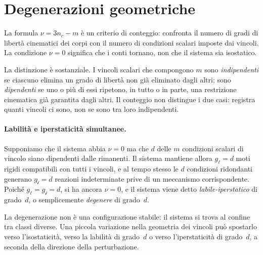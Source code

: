 \section{Degenerazioni geometriche}
\label{sec:degenerazioni}

La formula $\nu = 3n_c - m$ è un criterio di conteggio: confronta il numero di
gradi di libertà cinematici dei corpi con il numero di condizioni scalari
imposte dai vincoli.
La condizione $\nu = 0$ significa che i conti tornano, non che il sistema
sia isostatico.

La distinzione è sostanziale.
I vincoli scalari che compongono $m$ sono \emph{indipendenti} se ciascuno
elimina un grado di libertà non già eliminato dagli altri; sono
\emph{dipendenti} se uno o più di essi ripetono, in tutto o in parte,
una restrizione cinematica già garantita dagli altri.
Il conteggio non distingue i due casi: registra quanti vincoli ci sono,
non se sono tra loro indipendenti.

\paragraph{Labilità e iperstaticità simultanee.}
Supponiamo che il sistema abbia $\nu = 0$ ma che $d$ delle $m$ condizioni
scalari di vincolo siano dipendenti dalle rimanenti.
Il sistema mantiene allora $g_\ell = d$ moti rigidi compatibili con tutti
i vincoli, e al tempo stesso le $d$ condizioni ridondanti generano
$g_{\mathscr{i}} = d$ reazioni indeterminate prive di un meccanismo
corrispondente.
Poiché $g_\ell = g_{\mathscr{i}} = d$, si ha ancora $\nu = 0$, e il sistema
viene detto \emph{labile-iperstatico}
di grado~$d$, o semplicemente \emph{degenere}
di grado~$d$.

La degenerazione non è una configurazione stabile: il sistema si trova al
confine tra classi diverse.
Una piccola variazione nella geometria dei vincoli può spostarlo verso
l'isostaticità, verso la labilità di grado~$d$ o verso l'iperstaticità
di grado~$d$, a seconda della direzione della perturbazione.

